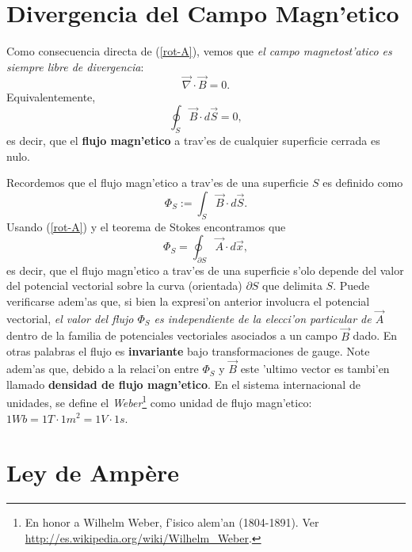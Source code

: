 \section{Divergencia del Campo Magn'etico}

Como consecuencia directa de (\ref{rot-A}), vemos que \textit{el campo magnetost'atico
es siempre libre de divergencia}:
\begin{equation}
 \boxed{\vec{\nabla}\cdot\vec{B}=0.} \label{divB}
\end{equation}
Equivalentemente,
\begin{equation}
 \oint_S\vec{B}\cdot d\vec{S}=0,
\end{equation}
es decir, que el \textbf{flujo magn'etico} a trav'es de cualquier superficie cerrada es nulo.

Recordemos que el flujo magn'etico a trav'es de una superficie $S$ es definido
como
\begin{equation}
 \Phi_S:= \int_S\vec{B}\cdot d\vec{S}.
\end{equation}
Usando (\ref{rot-A}) y el teorema de Stokes encontramos que
\begin{equation}\label{PAdx}
 \Phi_S=\oint_{\partial S}\vec{A}\cdot d\vec{x},
\end{equation}
es decir, que el flujo magn'etico a trav'es de una superficie s'olo depende del
valor del potencial vectorial sobre la curva (orientada) $\partial S$ que delimita $S$.
Puede verificarse adem'as que, si bien la expresi'on anterior involucra el
potencial vectorial, \textit{el valor del flujo $\Phi_S$ es independiente de la
elecci'on particular de $\vec{A}$} dentro de la familia de potenciales
vectoriales asociados a un campo $\vec B$ dado. En otras palabras el flujo es
\textbf{invariante} bajo transformaciones de gauge. Note adem'as que, debido a la
relaci'on entre $\Phi_S$ y $\vec{B}$ este 'ultimo vector es tambi'en llamado
\textbf{densidad de flujo magn'etico}. En el sistema internacional de unidades, se define el \textit{Weber}\footnote{En honor a Wilhelm Weber, f'isico alem'an (1804-1891). Ver \url{http://es.wikipedia.org/wiki/Wilhelm_Weber}.} como unidad de flujo magn'etico: $1Wb=1T\cdot 1m^2=1V\cdot 1s$.

\section{Ley de Amp\`ere}

